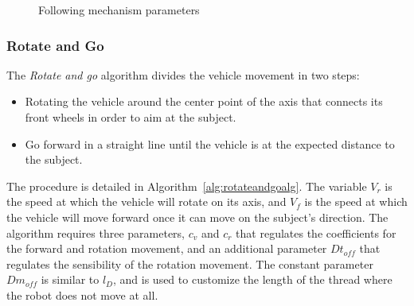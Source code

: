 \documentclass[journal]{IEEEtran}
\begin{document}
\begin{figure}[]
    \caption{Following mechanism parameters}
    \label{fig:follow_params}
\end{figure}{}

\subsubsection{Rotate and Go}

The \textit{Rotate and go} algorithm divides the vehicle movement in two steps:

\begin{itemize}
\item Rotating the vehicle around the center point of the axis that connects its front wheels in order to aim at the subject.
\item Go forward in a straight line until the vehicle is at the expected distance to the subject.
\end{itemize}

The procedure is detailed in Algorithm~\ref{alg:rotateandgoalg}.  The variable $V_r$ is the speed at which the vehicle will rotate on its axis, and $V_f$ is the speed at which the vehicle will move forward once it can move on the subject's direction.  The algorithm requires three parameters, $c_v$ and $c_r$ that regulates the coefficients for the forward and rotation movement, and an additional parameter $Dt_{off}$ that regulates the sensibility of the rotation movement.  The constant parameter $Dm_{off}$ is similar to $l_D$, and is used to customize the length of the thread where the robot does not move at all.
\end{document}
